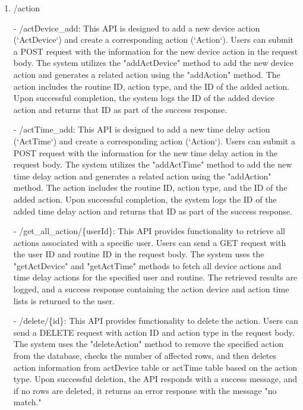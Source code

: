                     \begin{enumerate}
                        \item /action
                        \item[-] /actDevice\_add: This API is designed to add a new device action (`ActDevice`) and create a corresponding action (`Action`). Users can submit a POST request with the information for the new device action in the request body. The system utilizes the "addActDevice" method to add the new device action and generates a related action using the "addAction" method. The action includes the routine ID, action type, and the ID of the added action. Upon successful completion, the system logs the ID of the added device action and returns that ID as part of the success response.\\
                        \item[-] /actTime\_add: This API is designed to add a new time delay action (`ActTime`) and create a corresponding action (`Action`). Users can submit a POST request with the information for the new time delay action in the request body. The system utilizes the "addActTime" method to add the new time delay action and generates a related action using the "addAction" method. The action includes the routine ID, action type, and the ID of the added action. Upon successful completion, the system logs the ID of the added time delay action and returns that ID as part of the success response.\\
                        \item[-] /get\_all\_action/\{userId\}: This API provides functionality to retrieve all actions associated with a specific user. Users can send a GET request with the user ID and routine ID in the request body. The system uses the "getActDevice" and "getActTime" methods to fetch all device actions and time delay actions for the specified user and routine. The retrieved results are logged, and a success response containing the action device and action time lists is returned to the user.\\
                        \item[-] /delete/\{id\}: This API provides functionality to delete the action. Users can send a DELETE request with action ID and action type in the request body. The system uses the "deleteAction" method to remove the specified action from the database, checks the number of affected rows, and then deletes action information from actDevice table or actTime table based on the action type. Upon successful deletion, the API responds with a success message, and if no rows are deleted, it returns an error response with the message "no match."\\

\end{enumerate}
